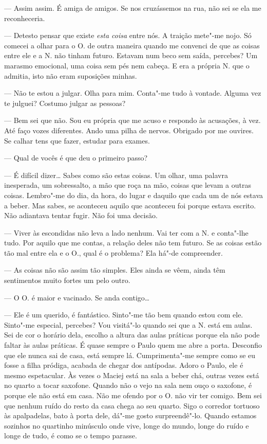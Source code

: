 --- Assim assim. É amiga de amigos. Se nos cruzássemos na rua, não sei se
  ela me reconheceria.

--- Detesto pensar que existe \emph{esta coisa }entre nós. A traição
  mete"-me nojo. Só comecei a olhar para o O. de outra maneira quando me
  convenci de que as coisas entre ele e a N. não tinham futuro. Estavam
  num beco sem saída, percebes? Um marasmo emocional, uma coisa sem pés
  nem cabeça. E era a própria N. que o admitia, isto não eram suposições
  minhas.

--- Não te estou a julgar. Olha para mim. Conta"-me tudo à vontade. Alguma
  vez te julguei? Costumo julgar as pessoas?

--- Bem sei que não. Sou eu própria que me acuso e respondo às
  acusações, à vez. Até faço vozes diferentes. Ando uma pilha de nervos.
  Obrigado por me ouvires. Se calhar tens
que fazer, estudar para exames.

--- Qual de vocês é que deu o primeiro passo?

--- É difícil dizer\ldots{} Sabes como são estas coisas. Um olhar, uma palavra
  inesperada, um sobressalto, a mão que roça na mão, coisas que levam a
  outras coisas. Lembro"-me do dia, da hora, do lugar e daquilo que cada
  um de nós estava a beber. Mas sabes, se aconteceu aquilo que aconteceu
  foi porque estava escrito. Não adiantava tentar fugir. Não foi uma
  decisão.

--- Viver às escondidas não leva a lado nenhum. Vai ter com a N. e
  conta"-lhe tudo. Por aquilo que me contas, a relação deles não tem
  futuro. Se as coisas estão tão mal entre ela e o O., qual é o
  problema? Ela há"-de compreender.

--- As coisas não são assim tão simples. Eles ainda se vêem, ainda têm
  sentimentos muito fortes um pelo outro.

--- O O. é maior e vacinado. Se anda contigo\ldots{}

--- Ele é um querido, é fantástico. Sinto"-me tão bem quando estou com ele.
  Sinto"-me especial, percebes? Vou visitá"-lo quando sei que a N. está
  em aulas. Sei de cor o horário dela, escolho a altura das aulas
  práticas porque ela não pode faltar às aulas práticas. É quase sempre
  o Paulo quem me abre a porta. Desconfio que ele nunca sai de casa,
  está sempre lá. Cumprimenta"-me sempre como se eu fosse a filha
  pródiga, acabada de chegar dos antípodas. Adoro o Paulo, ele é mesmo
  espetacular. Às vezes o Maciej está na sala a beber chá, outras vezes
  está no quarto a tocar saxofone. Quando não o vejo na sala nem ouço o
  saxofone, é porque ele não está em casa. Não me ofendo por o O. não
  vir ter comigo. Bem sei que nenhum ruído do resto da casa chega ao seu
  quarto. Sigo o corredor tortuoso às apalpadelas, bato à porta dele,
  dá"-me gosto surpreendê"-lo. Quando estamos sozinhos no quartinho
  minúsculo onde vive, longe do mundo, longe
do ruído e longe de tudo, é como se o tempo parasse.

